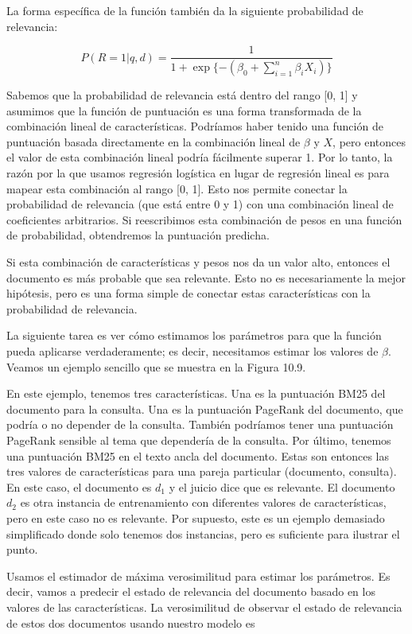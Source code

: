 La forma específica de la función también da la siguiente probabilidad de relevancia:

\begin{equation}
    P(R = 1 | q, d) = \frac{1}{1 + \exp\{-(\beta_0 + \sum_{i = 1}^n \beta_i X_i)\}}
\end{equation}

Sabemos que la probabilidad de relevancia está dentro del rango [0, 1] y asumimos que la función de puntuación es una forma transformada de la combinación lineal de características. Podríamos haber tenido una función de puntuación basada directamente en la combinación lineal de $\beta$ y $X$, pero entonces el valor de esta combinación lineal podría fácilmente superar 1. Por lo tanto, la razón por la que usamos regresión logística en lugar de regresión lineal es para mapear esta combinación al rango [0, 1]. Esto nos permite conectar la probabilidad de relevancia (que está entre 0 y 1) con una combinación lineal de coeficientes arbitrarios. Si reescribimos esta combinación de pesos en una función de probabilidad, obtendremos la puntuación predicha.

Si esta combinación de características y pesos nos da un valor alto, entonces el documento es más probable que sea relevante. Esto no es necesariamente la mejor hipótesis, pero es una forma simple de conectar estas características con la probabilidad de relevancia.

La siguiente tarea es ver cómo estimamos los parámetros para que la función pueda aplicarse verdaderamente; es decir, necesitamos estimar los valores de $\beta$. Veamos un ejemplo sencillo que se muestra en la Figura 10.9.

En este ejemplo, tenemos tres características. Una es la puntuación BM25 del documento para la consulta. Una es la puntuación PageRank del documento, que podría o no depender de la consulta. También podríamos tener una puntuación PageRank sensible al tema que dependería de la consulta. Por último, tenemos una puntuación BM25 en el texto ancla del documento. Estas son entonces las tres valores de características para una pareja particular (documento, consulta). En este caso, el documento es $d_1$ y el juicio dice que es relevante. El documento $d_2$ es otra instancia de entrenamiento con diferentes valores de características, pero en este caso no es relevante. Por supuesto, este es un ejemplo demasiado simplificado donde solo tenemos dos instancias, pero es suficiente para ilustrar el punto.

Usamos el estimador de máxima verosimilitud para estimar los parámetros. Es decir, vamos a predecir el estado de relevancia del documento basado en los valores de las características. La verosimilitud de observar el estado de relevancia de estos dos documentos usando nuestro modelo es

